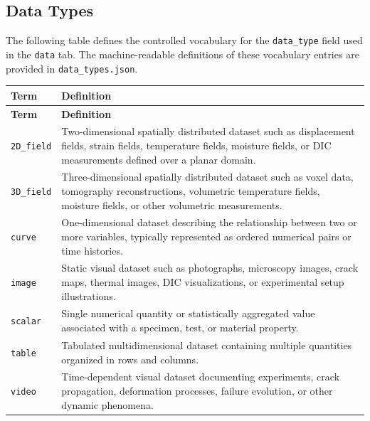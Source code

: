 \documentclass[11pt]{book}
\begin{document}
{\subsection{Data Types}
\label{vocab:data_types_list}

The following table defines the controlled vocabulary for the \texttt{data\_type} field used in the \texttt{data} tab. The machine-readable definitions of these vocabulary entries are provided in \texttt{data\_types.json}.

\begin{longtable}{p{}p{}}
\hline
\textbf{Term} & \textbf{Definition} \\
\hline
\endfirsthead

\hline
\textbf{Term} & \textbf{Definition} \\
\hline
\endhead

\texttt{2D\_field} &
Two-dimensional spatially distributed dataset such as displacement fields, strain fields, temperature fields, moisture fields, or DIC measurements defined over a planar domain. \\

\texttt{3D\_field} &
Three-dimensional spatially distributed dataset such as voxel data, tomography reconstructions, volumetric temperature fields, moisture fields, or other volumetric measurements. \\

\texttt{curve} &
One-dimensional dataset describing the relationship between two or more variables, typically represented as ordered numerical pairs or time histories. \\

\texttt{image} &
Static visual dataset such as photographs, microscopy images, crack maps, thermal images, DIC visualizations, or experimental setup illustrations. \\

\texttt{scalar} &
Single numerical quantity or statistically aggregated value associated with a specimen, test, or material property. \\

\texttt{table} &
Tabulated multidimensional dataset containing multiple quantities organized in rows and columns. \\

\texttt{video} &
Time-dependent visual dataset documenting experiments, crack propagation, deformation processes, failure evolution, or other dynamic phenomena. \\


\end{longtable}}
\end{document}
